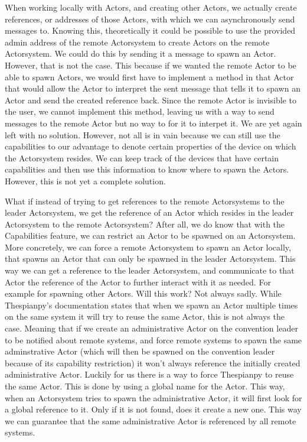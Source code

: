 \documentclass[a4paper]{article}
\begin{document}
When working locally with Actors, and creating other Actors, we actually create references, or addresses of those Actors, with which we can asynchronously send messages to. Knowing this, theoretically it could be possible to use the provided admin address of the remote Actorsystem to create Actors on the remote Actorsystem. We could do this by sending it a message to spawn an Actor. However, that is not the case. This because if we wanted the remote Actor to be able to spawn Actors, we would first have to implement a method in that Actor that would allow the Actor to interpret the sent message that tells it to spawn an Actor and send the created reference back. Since the remote Actor is invisible to the user, we cannot implement this method, leaving us with a way to send messages to the remote Actor but no way to for it to interpet it. We are yet again left with no solution. However, not all is in vain because we can still use the capabilities to our advantage to denote certain properties of the device on which the Actorsystem resides. We can keep track of the devices that have certain capabilities and then use this information to know where to spawn the Actors. However, this is not yet a complete solution.

What if instead of trying to get references to the remote Actorsystems to the leader Actorsystem, we get the reference of an Actor which resides in the leader Actorsystem to the remote Actorsystem? After all, we do know that with the Capabilities feature, we can restrict an Actor to be spawned on an Actorsystem. More concretely, we can force a remote Actorsystem to spawn an Actor locally, that spawns an Actor that can only be spawned in the leader Actorsystem. This way we can get a reference to the leader Actorsystem, and communicate to that Actor the reference of the Actor to further interact with it as needed. For example for spawning other Actors. Will this work? Not always sadly. While Thespianpy's documentation states that when we spawn an Actor multiple times on the same system it will try to reuse the same Actor, this is not always the case. Meaning that if we create an administrative Actor on the convention leader to be notified about remote systems, and force remote systems to spawn the same adminstrative Actor (which will then be spawned on the convention leader because of its capability restriction) it won't always reference the initially created administrative Actor. Luckily for us there is a way to force Thespianpy to reuse the same Actor. This is done by using a global name for the Actor. This way, when an Actorsystem tries to spawn the administrative Actor, it will first look for a global reference to it. Only if it is not found, does it create a new one. This way we can guarantee that the same administrative Actor is referenced by all remote systems.
\end{document}
